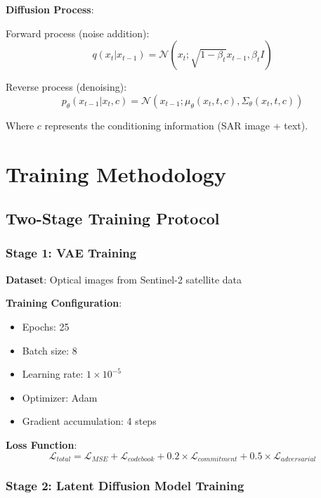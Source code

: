 \textbf{Diffusion Process}:

Forward process (noise addition):
\begin{equation}
q(x_t|x_{t-1}) = \mathcal{N}(x_t; \sqrt{1-\beta_t}x_{t-1}, \beta_t I)
\end{equation}

Reverse process (denoising):
\begin{equation}
p_\theta(x_{t-1}|x_t, c) = \mathcal{N}(x_{t-1}; \mu_\theta(x_t, t, c), \Sigma_\theta(x_t, t, c))
\end{equation}

Where $c$ represents the conditioning information (SAR image + text).

\section{Training Methodology}

\subsection{Two-Stage Training Protocol}

\subsubsection{Stage 1: VAE Training}

\textbf{Dataset}: Optical images from Sentinel-2 satellite data

\textbf{Training Configuration}:
\begin{itemize}
    \item Epochs: 25
    \item Batch size: 8
    \item Learning rate: $1 \times 10^{-5}$
    \item Optimizer: Adam
    \item Gradient accumulation: 4 steps
\end{itemize}

\textbf{Loss Function}:
\begin{equation}
\mathcal{L}_{total} = \mathcal{L}_{MSE} + \mathcal{L}_{codebook} + 0.2 \times \mathcal{L}_{commitment} + 0.5 \times \mathcal{L}_{adversarial}
\end{equation}

\subsubsection{Stage 2: Latent Diffusion Model Training}

